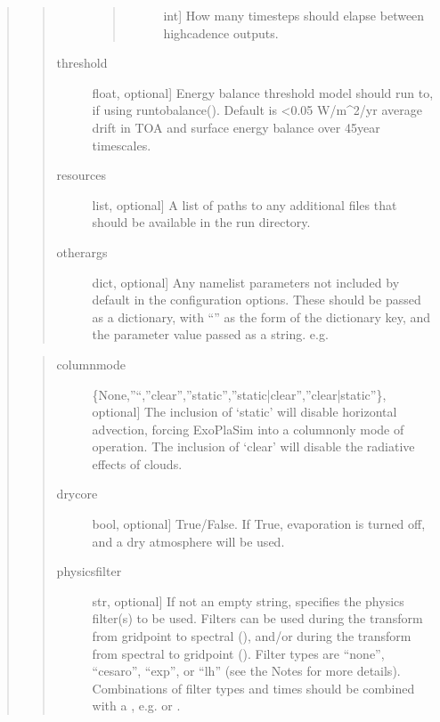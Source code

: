 \documentclass[letterpaper,10pt,english]{sphinxmanual}
\begin{document}
\begin{fulllineitems}
\begin{fulllineitems}
\begin{quote}
\begin{quote}
\begin{description}
\begin{quote}
\begin{description}
\item[{}] \leavevmode{[}int{]}
How many timesteps should elapse between high\sphinxhyphen{}cadence outputs.

\end{description}
\end{quote}

\item[{threshold}] \leavevmode{[}float, optional{]}
Energy balance threshold model should run to, if using runtobalance().
Default is \textless{}0.05 W/m\textasciicircum{}2/yr average drift in TOA and surface energy balance
over 45\sphinxhyphen{}year timescales.

\item[{resources}] \leavevmode{[}list, optional{]}
A list of paths to any additional files that should be available in the
run directory.

\item[{otherargs}] \leavevmode{[}dict, optional{]}
Any namelist parameters not included by default in the configuration options.
These should be passed as a dictionary, with “” as the
form of the dictionary key, and the parameter value passed as a string.
e.g. 

\end{description}
\end{quote}

\begin{quote}
\begin{description}
\item[{columnmode}] \leavevmode{[}\{None,”\sphinxhyphen{}“,”clear”,”static”,”static|clear”,”clear|static”\}, optional{]}
The inclusion of ‘static’ will disable horizontal advection, forcing ExoPlaSim
into a column\sphinxhyphen{}only mode of operation. The inclusion of ‘clear’ will disable
the radiative effects of clouds.

\item[{drycore}] \leavevmode{[}bool, optional{]}
True/False. If True, evaporation is turned off, and a dry atmosphere will
be used.

\item[{physicsfilter}] \leavevmode{[}str, optional{]}
If not an empty string, specifies the physics filter(s) to be used. Filters
can be used during the transform from gridpoint to spectral (), and/or
during the transform from spectral to gridpoint (). Filter types are
“none”, “cesaro”, “exp”, or “lh” (see the Notes for more details).
Combinations of filter types and times should be combined with a \sphinxcode{\sphinxupquote{|}},
e.g.  or .


\end{description}
\end{quote}
\end{quote}
\end{fulllineitems}
\end{fulllineitems}
\end{document}
